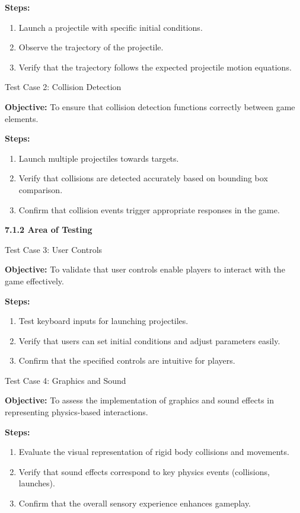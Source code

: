 \documentclass[
]{article}
\begin{document}
\textbf{Steps:}

\begin{enumerate}
\def\labelenumi{\arabic{enumi}.}
\item
  Launch a projectile with specific initial conditions.
\item
  Observe the trajectory of the projectile.
\item
  Verify that the trajectory follows the expected projectile motion
  equations.
\end{enumerate}

Test Case 2: Collision Detection

\textbf{Objective:} To ensure that collision detection functions
correctly between game elements.

\textbf{Steps:}

\begin{enumerate}
\def\labelenumi{\arabic{enumi}.}
\item
  Launch multiple projectiles towards targets.
\item
  Verify that collisions are detected accurately based on bounding box
  comparison.
\item
  Confirm that collision events trigger appropriate responses in the
  game.
\end{enumerate}

\textbf{7.1.2 Area of Testing}

Test Case 3: User Controls

\textbf{Objective:} To validate that user controls enable players to
interact with the game effectively.

\textbf{Steps:}

\begin{enumerate}
\def\labelenumi{\arabic{enumi}.}
\item
  Test keyboard inputs for launching projectiles.
\item
  Verify that users can set initial conditions and adjust parameters
  easily.
\item
  Confirm that the specified controls are intuitive for players.
\end{enumerate}

Test Case 4: Graphics and Sound

\textbf{Objective:} To assess the implementation of graphics and sound
effects in representing physics-based interactions.

\textbf{Steps:}

\begin{enumerate}
\def\labelenumi{\arabic{enumi}.}
\item
  Evaluate the visual representation of rigid body collisions and
  movements.
\item
  Verify that sound effects correspond to key physics events
  (collisions, launches).
\item
  Confirm that the overall sensory experience enhances gameplay.
\end{enumerate}
\end{document}
